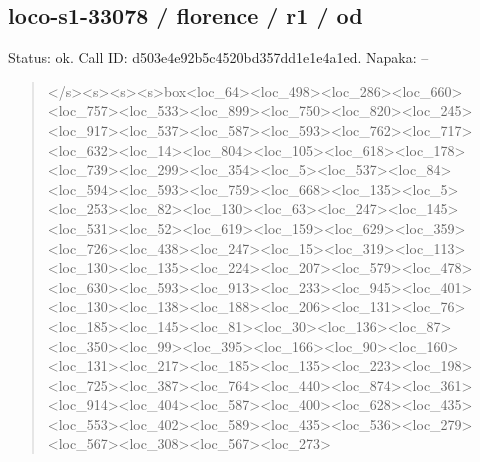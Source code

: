 \documentclass[10pt,a4paper]{article}
\begin{document}
\subsection*{loco-s1-33078 / florence / r1 / od}
Status: ok. Call ID: d503e4e92b5c4520bd357dd1e1e4a1ed. Napaka: --
\begin{quote}\footnotesize
</s>\allowbreak{}<s>\allowbreak{}<s>\allowbreak{}<s>\allowbreak{}box<loc\_64>\allowbreak{}<loc\_498\allowbreak{}>\allowbreak{}<loc\_286>\allowbreak{}<loc\_660>\allowbreak{}<loc\_757>\allowbreak{}<loc\allowbreak{}\_533>\allowbreak{}<loc\_899>\allowbreak{}<loc\_750>\allowbreak{}<loc\_820>\allowbreak{}\allowbreak{}<loc\_245>\allowbreak{}<loc\_917>\allowbreak{}<loc\_537>\allowbreak{}<loc\_\allowbreak{}587>\allowbreak{}<loc\_593>\allowbreak{}<loc\_762>\allowbreak{}<loc\_717>\allowbreak{}<\allowbreak{}loc\_632>\allowbreak{}<loc\_14>\allowbreak{}<loc\_804>\allowbreak{}<loc\_10\allowbreak{}5>\allowbreak{}<loc\_618>\allowbreak{}<loc\_178>\allowbreak{}<loc\_739>\allowbreak{}<lo\allowbreak{}c\_299>\allowbreak{}<loc\_354>\allowbreak{}<loc\_5>\allowbreak{}<loc\_537>\allowbreak{}<\allowbreak{}loc\_84>\allowbreak{}<loc\_594>\allowbreak{}<loc\_593>\allowbreak{}<loc\_75\allowbreak{}9>\allowbreak{}<loc\_668>\allowbreak{}<loc\_135>\allowbreak{}<loc\_5>\allowbreak{}<loc\_\allowbreak{}253>\allowbreak{}<loc\_82>\allowbreak{}<loc\_130>\allowbreak{}<loc\_63>\allowbreak{}<lo\allowbreak{}c\_247>\allowbreak{}<loc\_145>\allowbreak{}<loc\_531>\allowbreak{}<loc\_52>\allowbreak{}\allowbreak{}<loc\_619>\allowbreak{}<loc\_159>\allowbreak{}<loc\_629>\allowbreak{}<loc\_\allowbreak{}359>\allowbreak{}<loc\_726>\allowbreak{}<loc\_438>\allowbreak{}<loc\_247>\allowbreak{}<\allowbreak{}loc\_15>\allowbreak{}<loc\_319>\allowbreak{}<loc\_113>\allowbreak{}<loc\_13\allowbreak{}0>\allowbreak{}<loc\_135>\allowbreak{}<loc\_224>\allowbreak{}<loc\_207>\allowbreak{}<lo\allowbreak{}c\_579>\allowbreak{}<loc\_478>\allowbreak{}<loc\_630>\allowbreak{}<loc\_593\allowbreak{}>\allowbreak{}<loc\_913>\allowbreak{}<loc\_233>\allowbreak{}<loc\_945>\allowbreak{}<loc\allowbreak{}\_401>\allowbreak{}<loc\_130>\allowbreak{}<loc\_138>\allowbreak{}<loc\_188>\allowbreak{}\allowbreak{}<loc\_206>\allowbreak{}<loc\_131>\allowbreak{}<loc\_76>\allowbreak{}<loc\_1\allowbreak{}85>\allowbreak{}<loc\_145>\allowbreak{}<loc\_81>\allowbreak{}<loc\_30>\allowbreak{}<loc\allowbreak{}\_136>\allowbreak{}<loc\_87>\allowbreak{}<loc\_350>\allowbreak{}<loc\_99>\allowbreak{}<l\allowbreak{}oc\_395>\allowbreak{}<loc\_166>\allowbreak{}<loc\_90>\allowbreak{}<loc\_160\allowbreak{}>\allowbreak{}<loc\_131>\allowbreak{}<loc\_217>\allowbreak{}<loc\_185>\allowbreak{}<loc\allowbreak{}\_135>\allowbreak{}<loc\_223>\allowbreak{}<loc\_198>\allowbreak{}<loc\_725>\allowbreak{}\allowbreak{}<loc\_387>\allowbreak{}<loc\_764>\allowbreak{}<loc\_440>\allowbreak{}<loc\_\allowbreak{}874>\allowbreak{}<loc\_361>\allowbreak{}<loc\_914>\allowbreak{}<loc\_404>\allowbreak{}<\allowbreak{}loc\_587>\allowbreak{}<loc\_400>\allowbreak{}<loc\_628>\allowbreak{}<loc\_4\allowbreak{}35>\allowbreak{}<loc\_553>\allowbreak{}<loc\_402>\allowbreak{}<loc\_589>\allowbreak{}<l\allowbreak{}oc\_435>\allowbreak{}<loc\_536>\allowbreak{}<loc\_279>\allowbreak{}<loc\_56\allowbreak{}7>\allowbreak{}<loc\_308>\allowbreak{}<loc\_567>\allowbreak{}<loc\_273>\allowbr
\end{quote}
\end{document}
